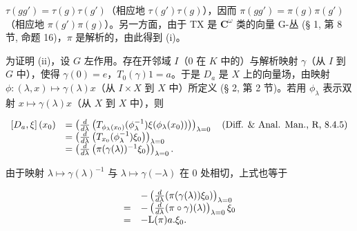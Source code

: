 \(\tau(gg') = \tau(g)\tau(g')\)（相应地 \(\tau(g')\tau(g)\)），因而 \(\pi(gg') = \pi(g)\pi(g')\)（相应地 \(\pi(g')\pi(g)\)）。另一方面，由于 TX 是 \(\mathbf{C}^{\omega}\) 类的向量 G-丛 (§ 1, 第 8 节, 命题 16)，\(\pi\) 是解析的，由此得到 (i)。

为证明 (ii)，设 \(G\) 左作用。存在开邻域 \(I\)（\(0\) 在 \(K\) 中的）与解析映射 \(\gamma\)（从 \(I\) 到 \(G\) 中），使得 \(\gamma(0) = e\)，\(T_0(\gamma)1 = a\)。于是 \(D_a\) 是 \(X\) 上的向量场，由映射 \(\phi: (\lambda, x) \mapsto \gamma(\lambda)x\)（从 \(I \times X\) 到 \(X\) 中）所定义 (§ 2, 第 2 节)。若用 \(\phi_{\lambda}\) 表示双射 \(x \mapsto \gamma(\lambda)x\)（从 \(X\) 到 \(X\) 中），则

\[
\begin{array}{r l} \left[ D _ {a}, \xi \right] (x _ {0}) & = \left(\frac {d}{d \lambda} \left(T _ {\phi_ {\lambda} (x _ {0})} (\phi_ {\lambda} ^ {- 1}) \xi (\phi_ {\lambda} (x _ {0}))\right)\right) _ {\lambda = 0} \quad \text {(Diff. \& Anal. Man., R, 8.4.5)} \\ & = \left(\frac {d}{d \lambda} \left(T _ {x _ {0}} (\phi_ {\lambda} ^ {- 1}) \xi_ {0}\right)\right) _ {\lambda = 0} \\ & = \left(\frac {d}{d \lambda} \left(\pi (\gamma (\lambda)) ^ {- 1} \xi_ {0}\right)\right) _ {\lambda = 0}. \end{array}
\]

由于映射 \(\lambda \mapsto \gamma (\lambda)^{-1}\) 与 \(\lambda \mapsto \gamma (-\lambda)\) 在 0 处相切，上式也等于

\[
\begin{array}{r l} & {- \left(\frac {d}{d \lambda} (\pi (\gamma (\lambda)) \xi_ {0})\right) _ {\lambda = 0}} \\ {=} & {- \left(\frac {d}{d \lambda} (\pi \circ \gamma) (\lambda)\right) _ {\lambda = 0} \xi_ {0}} \\ {=} & {- \mathrm{L} (\pi) a. \xi_ {0}.} \end{array}
\]
